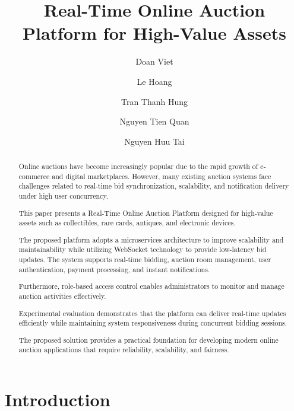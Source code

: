 \documentclass[runningheads]{llncs}
\begin{document}
\title{Real-Time Online Auction Platform for High-Value Assets}

\author{
Doan Viet
\and
Le Hoang
\and
Tran Thanh Hung
\and
Nguyen Tien Quan
\and
Nguyen Huu Tai
}



\maketitle

\begin{abstract}

Online auctions have become increasingly popular due to the rapid growth of e-commerce and digital marketplaces. However, many existing auction systems face challenges related to real-time bid synchronization, scalability, and notification delivery under high user concurrency.

This paper presents a Real-Time Online Auction Platform designed for high-value assets such as collectibles, rare cards, antiques, and electronic devices.

The proposed platform adopts a microservices architecture to improve scalability and maintainability while utilizing WebSocket technology to provide low-latency bid updates. The system supports real-time bidding, auction room management, user authentication, payment processing, and instant notifications.

Furthermore, role-based access control enables administrators to monitor and manage auction activities effectively.

Experimental evaluation demonstrates that the platform can deliver real-time updates efficiently while maintaining system responsiveness during concurrent bidding sessions.

The proposed solution provides a practical foundation for developing modern online auction applications that require reliability, scalability, and fairness.


\end{abstract}

\section{Introduction}
\end{document}
